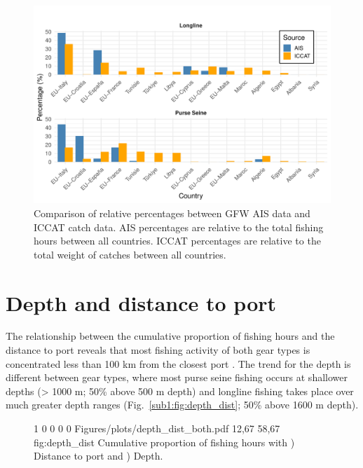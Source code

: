 \begin{figure}[ht]
    \centering
    \includegraphics[width=1\linewidth, trim=0 0 0 1cm,clip]{Figures/plots/ais_vs_iccat.pdf}
    \caption{Comparison of relative percentages between GFW AIS data and ICCAT catch data. AIS percentages are relative to the
    total fishing hours between all countries. ICCAT percentages are relative to the total weight of catches between all countries.}
    \label{fig:ais_iccat}
\end{figure}

\FloatBarrier
\section{Depth and distance to port}

The relationship between the cumulative proportion of fishing hours and the distance to port reveals that most fishing activity of both gear types is concentrated
less than 100 km from the closest port . The trend for the depth is different between gear types, where most purse seine
fishing occurs at shallower depths (> 1000 m; 50\% above 500 m depth) and longline fishing takes place over much greater depth ranges (Fig.~\ref{sub1:fig:depth_dist}; 50\% above 1600 m depth).

\begin{figure}[ht]
    {1\linewidth}                           %
    {0 0 0 0}                       %
    {Figures/plots/depth_dist_both.pdf} %
    {12,67}                                  %
    {58,67}                                  %
    {fig:depth_dist}
    {%
    Cumulative proportion of fishing hours with ) Distance to port and ) Depth.}
\end{figure}
